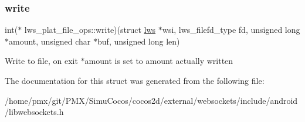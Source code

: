 \subsubsection{\texorpdfstring{write}{write}}
{\footnotesize\ttfamily int($\ast$ lws\+\_\+plat\+\_\+file\+\_\+ops\+::write)(struct \hyperlink{structlws}{lws} $\ast$wsi, lws\+\_\+filefd\+\_\+type fd, unsigned long $\ast$amount, unsigned char $\ast$buf, unsigned long len)}

Write to file, on exit $\ast$amount is set to amount actually written 

The documentation for this struct was generated from the following file\+:\begin{DoxyCompactItemize}
\item 
/home/pmx/git/\+P\+M\+X/\+Simu\+Cocos/cocos2d/external/websockets/include/android/libwebsockets.\+h\end{DoxyCompactItemize}
